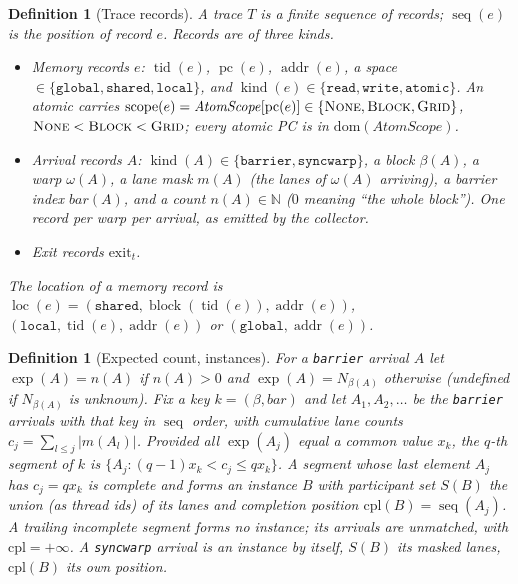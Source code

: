 \documentclass[11pt]{article}
\newtheorem{definition}[theorem]{Definition}
\theoremstyle{remark}
\DeclareMathOperator{\tid}{tid}
\DeclareMathOperator{\addr}{addr}
\DeclareMathOperator{\kind}{kind}
\DeclareMathOperator{\pc}{pc}
\DeclareMathOperator{\seq}{seq}
\DeclareMathOperator{\loc}{loc}
\DeclareMathOperator{\blk}{block}
\DeclareMathOperator{\scope}{scope}
\newcommand{\ext}[1]{\mathrm{exit}_{#1}}
\begin{document}
\begin{definition}[Trace records]\label{def:trace}
A trace $T$ is a finite sequence of records; $\seq(e)$ is the position of
record $e$. Records are of three kinds.
\begin{itemize}
\item \emph{Memory records} $e$: $\tid(e)$, $\pc(e)$, $\addr(e)$, a space
      $\in\{\texttt{global},\texttt{shared},\texttt{local}\}$, and
      $\kind(e)\in\{\texttt{read},\texttt{write},\texttt{atomic}\}$. An atomic
      carries $\scope(e)=\mathit{AtomScope}[\pc(e)]\in
      \{\textsc{None},\textsc{Block},\textsc{Grid}\}$,
      $\textsc{None}<\textsc{Block}<\textsc{Grid}$; every atomic PC is in
      $\mathrm{dom}(\mathit{AtomScope})$.
\item \emph{Arrival records} $A$: $\kind(A)\in\{\texttt{barrier},\texttt{syncwarp}\}$,
      a block $\beta(A)$, a warp $\omega(A)$, a lane mask $m(A)$ (the lanes of
      $\omega(A)$ arriving), a barrier index $\mathit{bar}(A)$, and a count
      $n(A)\in\mathbb{N}$ ($0$ meaning ``the whole block''). One record per
      warp per arrival, as emitted by the collector.
\item \emph{Exit records} $\ext{t}$.
\end{itemize}
The \emph{location} of a memory record is
$\loc(e)=(\texttt{shared},\blk(\tid(e)),\addr(e))$,
$(\texttt{local},\tid(e),\addr(e))$ or $(\texttt{global},\addr(e))$.
\end{definition}

\begin{definition}[Expected count, instances]\label{def:instance}
For a \texttt{barrier} arrival $A$ let $\exp(A)=n(A)$ if $n(A)>0$ and
$\exp(A)=N_{\beta(A)}$ otherwise (undefined if $N_{\beta(A)}$ is unknown).
Fix a key $k=(\beta,\mathit{bar})$ and let $A_1,A_2,\ldots$ be the
\texttt{barrier} arrivals with that key in $\seq$ order, with cumulative lane
counts $c_j=\sum_{l\le j}|m(A_l)|$. Provided all $\exp(A_j)$ equal a common
value $x_k$, the $q$-th \emph{segment} of $k$ is
$\{A_j:(q-1)x_k<c_j\le qx_k\}$. A segment whose last element $A_j$ has
$c_j=qx_k$ is \emph{complete} and forms an \emph{instance} $B$ with
participant set $S(B)$ the union (as thread ids) of its lanes and completion
position $\mathrm{cpl}(B)=\seq(A_j)$. A trailing incomplete segment forms no
instance; its arrivals are \emph{unmatched}, with $\mathrm{cpl}=+\infty$.
A \texttt{syncwarp} arrival is an instance by itself, $S(B)$ its masked lanes,
$\mathrm{cpl}(B)$ its own position.
\end{definition}
\end{document}
